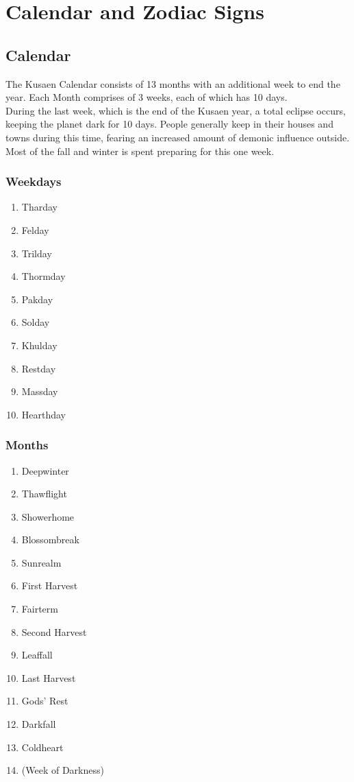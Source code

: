 \chapter{Calendar and Zodiac Signs}\label{ch:calendarAndZodiacs}
\section{Calendar}\label{sec:calendar}
The Kusaen Calendar consists of 13 months with an additional week to end the year.
Each Month comprises of 3 weeks, each of which has 10 days.\\
During the last week, which is the end of the Kusaen year, a total eclipse occurs, keeping the planet dark for 10 days.
People generally keep in their houses and towns during this time, fearing an increased amount of demonic influence outside.
Most of the fall and winter is spent preparing for this one week.\\
\subsection{Weekdays}\label{subsec:weekdays}
\begin{enumerate}
	\item Tharday
	\item Felday
	\item Trilday
	\item Thormday
	\item Pakday
	\item Solday
	\item Khulday
	\item Restday
	\item Massday
	\item Hearthday
\end{enumerate}


\subsection{Months}\label{subsec:months}
\begin{enumerate}
	\item Deepwinter
	\item Thawflight
	\item Showerhome
	\item Blossombreak
	\item Sunrealm
	\item First Harvest
	\item Fairterm
	\item Second Harvest
	\item Leaffall
	\item Last Harvest
	\item Gods' Rest
	\item Darkfall
	\item Coldheart
	\item (Week of Darkness)
\end{enumerate}


